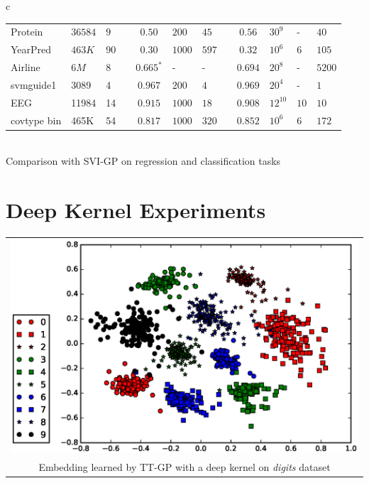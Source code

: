 \documentclass[a0,portrait]{a0poster}
\begin{document}
\begin{multicols}{2}
\begin{tabular}{c}
\begin{tabular}{lll l cll l clll}
    Protein & $36584$ & $9$ &&
    $0.50$ & $200$ & $45$ &&
    $\mathbf{0.56}$ & $30^9$ & - & $40$ \\

    YearPred & $463K$ & $90$ &&
    $0.30$ & $1000$ & $597$ &&
    $\mathbf{0.32}$ & $10^6$ & $6$ & $105$ \\

    \midrule
    Airline & $6M$ & $8$ &&
    $0.665^*$ & - & - &&
    $\mathbf{0.694}$ & $20^8$ & - & $5200$ \\

    svmguide1 & 3089 & 4 &&
    $0.967$ & $200$ & $4$ &&
    $\mathbf{0.969}$ & $20^4$ & - & $1$\\

    EEG & 11984 & 14 &&
    $\mathbf{0.915}$ & $1000$ & $18$ &&
    $0.908$ & $12^{10}$ & $10$ & $10$\\

    covtype bin & 465K & 54 &&
    $0.817$ & $1000$ & $320$ &&
    $\mathbf{0.852}$ & $10^6$ & $6$ & $172$\\
    \bottomrule
  \end{tabular}\\
Comparison with SVI-GP \citep{hensman2013} on regression and classification
tasks
\end{tabular}
\section*{\LARGE \color{NavyBlue} Deep Kernel Experiments}
    
\begin{center}
\begin{tabular}{c}
    \includegraphics[width=20cm]{pics/embed/embedding_2.eps}
    \\
  Embedding learned by TT-GP with a deep kernel on {\it digits}
  dataset
\end{tabular}
\end{center}


\end{multicols}
\end{document}
